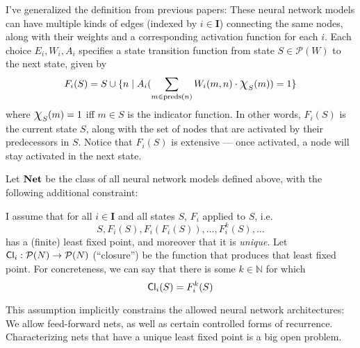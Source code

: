 \documentclass[letterpaper]{article}
\begin{document}
I've generalized the definition from previous papers: These neural network models can have multiple kinds of edges (indexed by $i \in \textbf{I}$) connecting the same nodes, along with their weights and a corresponding activation function for each $i$.  Each choice $E_i, W_i, A_i$ specifies a state transition function from state $S \in \mathcal{P}(W)$ to the next state, given by
\[
    F_i(S) = S \cup \{ n \mid A_i(\sum_{m \in \mathrm{preds}(n)} W_i(m, n) \cdot \mbox{\Large$\chi$}_S(m)) = 1 \}
\]
where $\mbox{\Large$\chi$}_S(m) = 1$ iff $m \in S$ is the indicator function.  In other words, $F_i(S)$ is the current state $S$, along with the set of nodes that are activated by their predecessors in $S$.  Notice that $F_i(S)$ is extensive --- once activated, a node will stay activated in the next state.

Let $\textrm{\textbf{Net}}$ be the class of all neural network models defined above, with the following additional constraint: 

\begin{postulate*}
    I assume that for all $i \in \textbf{I}$ and all states $S$, $F_i$ applied to $S$, i.e.
    \[
        S, F_i(S), F_i(F_i(S)), \ldots, F^k_i(S), \ldots
    \]
    has a (finite) least fixed point, and moreover that it is \emph{unique}.  Let $\mathsf{Cl}_i : \mathcal{P}(N) \to \mathcal{P}(N)$ (``closure'') be the function that produces that least fixed point.  For concreteness, we can say that there is some $k\in \mathbb{N}$ for which
    \[
        \mathsf{Cl}_i(S) = F_i^k(S)
    \]
\end{postulate*}
This assumption implicitly constrains the allowed neural network architectures: We allow feed-forward nets, as well as certain controlled forms of recurrence.  Characterizing nets that have a unique least fixed point is a big open problem.
\end{document}
